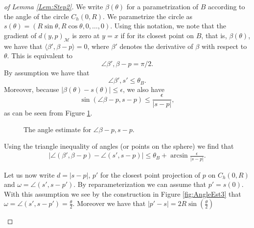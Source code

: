 \documentclass[10pt,a4paper]{amsart}
\newcommand{\M}{\mathcal{M}}
\begin{document}
\begin{proof}[of Lemma \ref{Lem:Step2}] 
We write $\beta (\theta)$ for a parametrization of $B$ according to the angle of the circle $C_h(0,R)$. We parametrize the circle as $s(\theta) =( R \sin \theta,R\cos \theta, 0 , \dots ,0 )$. Using this notation, we note that the gradient of $d(y, p)_\M$ is zero at $y=x$ if for its closest point on $B$, that is, $\beta(\theta)$, we have that 
$ \langle {\beta}',\beta- p  \rangle =0 $, where $\beta'$ denotes the derivative of $\beta$ with respect to $\theta$. This is equivalent to 
\[ \angle  {\beta}',\beta- p  = \pi/2.
\]
By assumption we have that 
\[  \angle  {\beta}' , s' \leq \theta_B.
\]
Moreover, because $| \beta(\theta) - s(\theta) | \leq \epsilon $, we also have 
\[ \sin (\angle \beta -p , s- p)   \leq  \frac{\epsilon} { |s -p| }, 
\]
as can be seen from Figure \ref{fig:Obvious}. 
%

\begin{figure}[h!]
    \centering
    
    \caption{The angle estimate for $\angle \beta -p , s- p $. }
    \label{fig:Obvious}
\end{figure}


%
%
%
%
%
%
%
%
%
%
%
%
%
%
%
%
%
%
%
%
%
%
%
%
%
%
%
%
%
%
%
%
%
%
%
%
%
%
%
%
%
%
%
%
%
%
%
%
%
%
%
%
%
%
%
%
%

Using the triangle inequality of angles (or points on the sphere) we find that 
\begin{align} 
|\angle  ({\beta}',\beta- p)  -  \angle  ({s}',s- p) | \leq  \theta_B + \arcsin \frac{\epsilon} { |s -p| } . 
\label{eg:TriangleIneq1}
\end{align} 
%

Let us now write $d= | s- p|$, $p'$ for the closest point projection of $p$ on $C_h(0,R)$
%
and $\omega = \angle  ({s}',s- p')$. 
By reparameterization we can assume that $p'= s(0)$. With this assumption we see by the construction in Figure \ref{fig:AngleEst3} that  $\omega=\angle  ({s}',s- p') = \frac{\theta}{2}$. Moreover we have that $|p'- s | = 2 R \sin (\frac{\theta}{2}) $
\begin{figure}[h!]
    \centering
    

\end{figure}
\end{proof}
\end{document}
